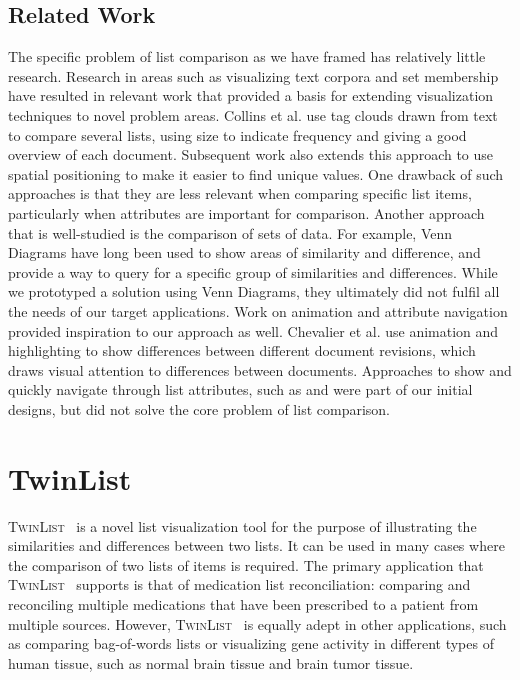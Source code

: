 \documentclass{chi2009}
\newcommand{\TwinList}{\textsc{TwinList}}
\begin{document}
\subsection{Related Work}
The specific problem of list comparison as we have framed has relatively little research. Research in areas such as visualizing text corpora and set membership have resulted in relevant work that provided a basis for extending visualization techniques to novel problem areas.  Collins et al.\cite{collins2009parallel} use tag clouds drawn from text to compare several lists, using size to indicate frequency and giving a good overview of each document. Subsequent work also extends this approach to use spatial positioning to make it easier to find unique values\cite{conwaytuscon11}. One drawback of such approaches is that they are less relevant when comparing specific list items, particularly when attributes are important for comparison. Another approach that is well-studied is the comparison of sets of data. For example, Venn Diagrams have long been used to show areas of similarity and difference, and provide a way to query for a specific group of similarities and differences\cite{kestler2005generalized}. While we prototyped a solution using Venn Diagrams, they ultimately did not fulfil all the needs of our target applications. Work on animation and attribute navigation provided inspiration to our approach as well. Chevalier et al. \cite{diffmation10} use animation and highlighting to show differences between different document revisions, which draws visual attention to differences between documents. Approaches to show and quickly navigate through list attributes, such as \cite{Chimera:1992:VBI:142750.142817} and \cite{Masui98lensbar} were part of our initial designs, but did not solve the core problem of list comparison.

\section{TwinList}
\TwinList~ is a novel list visualization tool for the purpose of illustrating the similarities and differences between two lists. It can be used in many cases where the comparison of two lists of items is required. The primary application that \TwinList~ supports is that of medication list reconciliation: comparing and reconciling multiple medications that have been prescribed to a patient from multiple sources\cite{JCAHO-2006}. However, \TwinList~ is equally adept in other applications, such as comparing bag-of-words lists or visualizing gene activity in different types of human tissue, such as normal brain tissue and brain tumor tissue.
\end{document}
